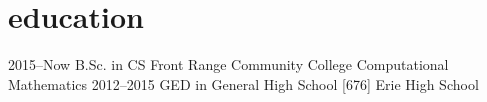 \documentclass[]{cv-style}
\begin{document}
\vspace{-0.6cm}
\section{education}
\vspace{-0.3cm}
\begin{entrylist}
\entry
{2015--Now}
{B.Sc. {\normalfont in CS}}
{Front Range Community College}
{Computational Mathematics}
\entry
{2012--2015}
{GED {\normalfont in General High School [676]}}
{Erie High School}
{\vspace{-0.3cm}}
\end{entrylist}
\nopagebreak
\end{document}
